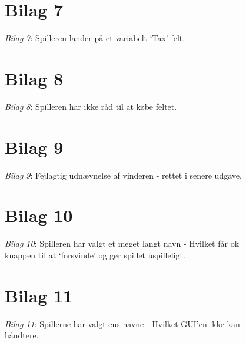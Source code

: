 \begin{appendices}
\begin{figure}[h]
\section*{Bilag 7}\label{bilag7}
\centering
{}
\caption{\emph{Bilag 7}: Spilleren lander på et variabelt ‘Tax’ felt.}
\end{figure}
\FloatBarrier
\begin{figure}[h]
\section*{Bilag 8}\label{bilag8}
\centering
{}
\caption{\emph{Bilag 8}: Spilleren har ikke råd til at købe feltet.}
\end{figure}
\FloatBarrier
\begin{figure}[h]
\section*{Bilag 9}\label{bilag9}
\centering
{}
\caption{\emph{Bilag 9}: Fejlagtig udnævnelse af vinderen - rettet i senere udgave.}
\end{figure}
\FloatBarrier
\begin{figure}[h]
\section*{Bilag 10}\label{bilag10}
\centering
{}
\caption{\emph{Bilag 10}: Spilleren har valgt et meget langt navn - Hvilket får
ok knappen til at ‘forsvinde’ og gør spillet uspilleligt.}
\end{figure}
\FloatBarrier
\begin{figure}[h]
\section*{Bilag 11}\label{bilag11}
\centering
{}
\caption{\emph{Bilag 11}: Spillerne har valgt ens navne - Hvilket GUI’en ikke
kan håndtere.}
\end{figure}
\FloatBarrier
\end{appendices}